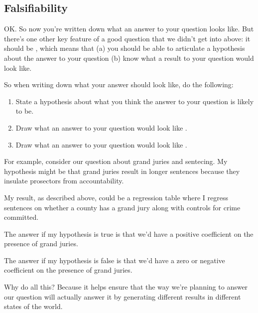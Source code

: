 \documentclass[letterpaper,10pt,english]{jupyterBook}
\begin{document}
\subsection{Falsifiability}
\label{\detokenize{40_in_practice/05_backwards_design:falsifiability}}
\sphinxAtStartPar
OK. So now you’re written down what an answer to your question looks like. But there’s one other key feature of a good question that we didn’t get into above: it should be , which means that (a) you should be able to articulate a hypothesis about the answer to your question  (b) know what a result to your question would look like.

\sphinxAtStartPar
So when writing down what your answer should look like, do the following:
\begin{enumerate}
%
\item {} 
\sphinxAtStartPar
State a hypothesis about what you think the answer to your question is likely to be.

\item {} 
\sphinxAtStartPar
Draw what an answer to your question would look like .

\item {} 
\sphinxAtStartPar
Draw what an answer to your question would look like .

\end{enumerate}

\sphinxAtStartPar
For example, consider our question about grand juries and sentecing. My hypothesis might be that grand juries result in longer sentences because they insulate prosectors from accountability.

\sphinxAtStartPar
My result, as described above, could be a regression table where I regress sentences on whether a county has a grand jury along with controls for crime committed.

\sphinxAtStartPar
The answer if my hypothesis is true is that we’d have a positive coefficient on the presence of grand juries.

\sphinxAtStartPar
The answer if my hypothesis is false is that we’d have a zero or negative coefficient on the presence of grand juries.

\sphinxAtStartPar
Why do all this? Because it helps ensure that the way we’re planning to answer our question will actually answer it by generating different results in different states of the world.
\end{document}
